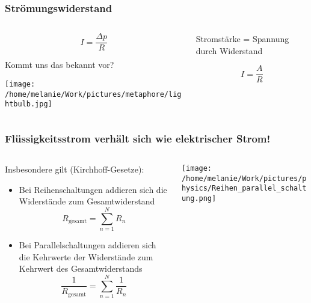 \documentclass{beamer}
\begin{document}
\begin{frame}
\frametitle{Strömungswiderstand}

\begin{columns}[c]

\begin{column}{5cm}

\[
I = \frac{\Delta p}{R}
\]

Kommt uns das bekannt vor?


\pause

\begin{center}
\texttt{[image: /home/melanie/Work/pictures/metaphore/lightbulb.jpg]}
\end{center}



\end{column}

\begin{column}{5cm}



Stromstärke = Spannung durch Widerstand

\[
I = \frac{A}{R}
\]

\end{column}

\end{columns}

\end{frame}

\begin{frame}
\frametitle{Flüssigkeitsstrom verhält sich wie elektrischer Strom!}

\begin{columns}[c]

\begin{column}{7cm}
Insbesondere gilt (Kirchhoff-Gesetze):
\begin{itemize}
\item
Bei Reihenschaltungen addieren sich die Widerstände zum Gesamtwiderstand 
\[
R_{\text{gesamt}} = \sum_{n=1}^N R_n
\]

\item
Bei Parallelschaltungen addieren sich die Kehrwerte der Widerstände zum Kehrwert des Gesamtwiderstands 
\[
\frac{1}{R_{\text{gesamt}}} = \sum_{n=1}^N \frac{1}{R_n}
\]


\end{itemize}
\end{column}

\begin{column}{4cm}

\begin{center}
\texttt{[image: /home/melanie/Work/pictures/physics/Reihen\_parallel\_schaltung.png]}
\end{center}
\end{column}

\end{columns}

\end{frame}
\end{document}
